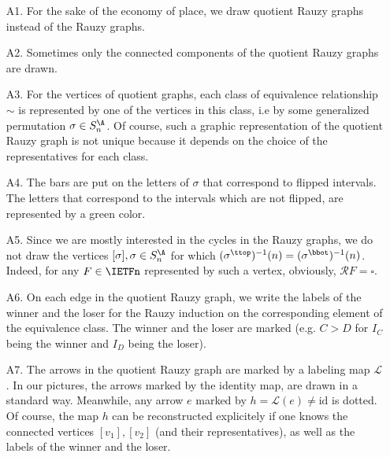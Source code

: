 \documentclass[12pt]{article}
\theoremstyle{definition}
\begin{document}
\begin{itemize}
\item[A1.] For the sake of the economy of place, we draw quotient Rauzy graphs instead of the Rauzy graphs.
\item[A2.] Sometimes only the connected components of the quotient Rauzy graphs are drawn.
\item[A3.] For the vertices of quotient graphs, each class of equivalence relationship $\sim$ is represented by one of the vertices in this class, i.e by some generalized permutation $\sigma \in S_n^{\A}$. Of course, such a graphic representation of the quotient Rauzy graph is not unique because it depends on the choice of the representatives for each class.
\item[A4.] The bars are put on the letters of $\sigma$ that correspond to flipped intervals. The letters that correspond to the intervals which are not flipped, are represented by a green color. 
\item[A5.] Since we are mostly interested in the cycles in the Rauzy graphs, we do not draw the vertices $[\sigma], \sigma \in S_n^{\A}$ for which  $(\sigma^{\ttop})^{-1}(n)=(\sigma^{\bbot})^{-1}(n)$. Indeed, for any $F \in \IETFn$ represented by such a vertex, obviously, $\mathcal{R} F = \square$.
\item[A6.] On each edge in the quotient Rauzy graph, we write the labels of the winner and the loser for the Rauzy induction on the corresponding element of the equivalence class. The winner and the loser are marked (e.g. $C>D$ for $I_C$ being the winner and $I_D$ being the loser). 
\item[A7.] The arrows in the quotient Rauzy graph are marked by a labeling map $\mathcal{L}$. In our pictures, the arrows marked by the identity map, are drawn in a standard way. Meanwhile, any arrow $e$ marked by  $h=\mathcal{L}(e) \neq \mathrm{id}$ is dotted. Of course, the map $h$ can be reconstructed explicitely if one knows the connected vertices $[v_1], [v_2]$ (and their representatives), as well as the labels of the winner and the loser.
\end{itemize}
\end{document}
